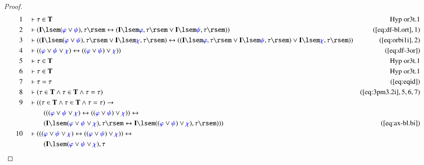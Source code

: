 \begin{proof}
\begin{align}
  1 &&  & \vdash \tau \in \mathbf{T}&\text{Hyp~or3t.1}\notag%
  \\ 2 &&  & \vdash ( \mathbf{I} \lsem ( \mw{\varphi} \vee \mw{\psi} ) , \tau
      \rsem \leftrightarrow ( \mathbf{I} \lsem \mw{\varphi}
      , \tau \rsem \vee \mathbf{I} \lsem \mw{\psi} , \tau
      \rsem ) )&(\mbox{\ref{eq:df-bl.ort}},1)\notag
  \\ 3 &&  & \vdash ( ( \mathbf{I} \lsem ( \mw{\varphi} \vee \mw{\psi} ) , \tau
      \rsem \vee \mathbf{I} \lsem \mw{\chi} , \tau \rsem )
      \leftrightarrow ( ( \mathbf{I} \lsem \mw{\varphi} ,
      \tau \rsem \vee \mathbf{I} \lsem \mw{\psi} , \tau
      \rsem ) \vee \mathbf{I} \lsem \mw{\chi} , \tau \rsem
      ) )&(\mbox{\ref{eq:orbi1i}},2)\notag
  \\ 4 &&  & \vdash ( ( \mw{\varphi} \vee \mw{\psi} \vee \mw{\chi} )
      \leftrightarrow ( ( \mw{\varphi} \vee \mw{\psi} )
      \vee \mw{\chi} ) )&(\mbox{\ref{eq:df-3or}})\notag
  \\ 5 &&  & \vdash \tau \in \mathbf{T}&\text{Hyp~or3t.1}\notag%
  \\ 6 &&  & \vdash \tau \in \mathbf{T}&\text{Hyp~or3t.1}\notag%
  \\ 7 &&  & \vdash \tau = \tau&(\mbox{\ref{eq:eqid}})\notag
  \\ 8 &&  & \vdash ( \tau \in \mathbf{T} \wedge \tau \in \mathbf{T} \wedge
      \tau = \tau )&(\mbox{\ref{eq:3pm3.2i}},5,6,7)\notag
  \\ 9 &&  & \vdash ( ( \tau \in \mathbf{T} \wedge \tau \in \mathbf{T} \wedge
      \tau = \tau ) \rightarrow  \notag \\ & & & \qquad
      ( ( ( \mw{\varphi} \vee
      \mw{\psi} \vee \mw{\chi} ) \leftrightarrow ( (
      \mw{\varphi} \vee \mw{\psi} ) \vee \mw{\chi} ) )
      \leftrightarrow  \notag \\ & & & \qquad
      ( \mathbf{I} \lsem ( \mw{\varphi}
      \vee \mw{\psi} \vee \mw{\chi} ) , \tau \rsem
      \leftrightarrow \mathbf{I} \lsem ( ( \mw{\varphi}
      \vee \mw{\psi} ) \vee \mw{\chi} ) , \tau \rsem ) )
      )&(\mbox{\ref{eq:ax-bl.bi}})\notag
  \\ 10 &&  & \vdash ( ( ( \mw{\varphi} \vee \mw{\psi} \vee \mw{\chi} )
      \leftrightarrow ( ( \mw{\varphi} \vee \mw{\psi} )
      \vee \mw{\chi} ) ) \leftrightarrow  \notag \\ & & & \qquad
      ( \mathbf{I} \lsem
      ( \mw{\varphi} \vee \mw{\psi} \vee \mw{\chi} ) , \tau

\end{align}
\end{proof}
